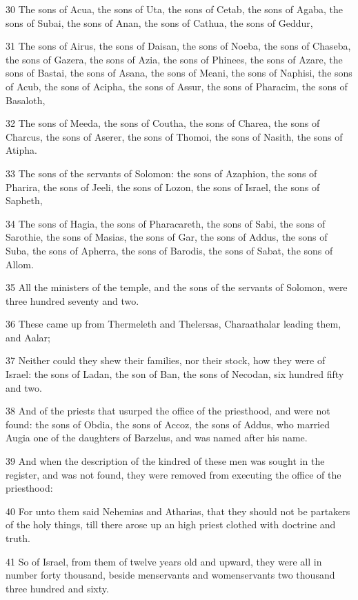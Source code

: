 \par 30 The sons of Acua, the sons of Uta, the sons of Cetab, the sons of Agaba, the sons of Subai, the sons of Anan, the sons of Cathua, the sons of Geddur,
\par 31 The sons of Airus, the sons of Daisan, the sons of Noeba, the sons of Chaseba, the sons of Gazera, the sons of Azia, the sons of Phinees, the sons of Azare, the sons of Bastai, the sons of Asana, the sons of Meani, the sons of Naphisi, the sons of Acub, the sons of Acipha, the sons of Assur, the sons of Pharacim, the sons of Basaloth,
\par 32 The sons of Meeda, the sons of Coutha, the sons of Charea, the sons of Charcus, the sons of Aserer, the sons of Thomoi, the sons of Nasith, the sons of Atipha.
\par 33 The sons of the servants of Solomon: the sons of Azaphion, the sons of Pharira, the sons of Jeeli, the sons of Lozon, the sons of Israel, the sons of Sapheth,
\par 34 The sons of Hagia, the sons of Pharacareth, the sons of Sabi, the sons of Sarothie, the sons of Masias, the sons of Gar, the sons of Addus, the sons of Suba, the sons of Apherra, the sons of Barodis, the sons of Sabat, the sons of Allom.
\par 35 All the ministers of the temple, and the sons of the servants of Solomon, were three hundred seventy and two.
\par 36 These came up from Thermeleth and Thelersas, Charaathalar leading them, and Aalar;
\par 37 Neither could they shew their families, nor their stock, how they were of Israel: the sons of Ladan, the son of Ban, the sons of Necodan, six hundred fifty and two.
\par 38 And of the priests that usurped the office of the priesthood, and were not found: the sons of Obdia, the sons of Accoz, the sons of Addus, who married Augia one of the daughters of Barzelus, and was named after his name.
\par 39 And when the description of the kindred of these men was sought in the register, and was not found, they were removed from executing the office of the priesthood:
\par 40 For unto them said Nehemias and Atharias, that they should not be partakers of the holy things, till there arose up an high priest clothed with doctrine and truth.
\par 41 So of Israel, from them of twelve years old and upward, they were all in number forty thousand, beside menservants and womenservants two thousand three hundred and sixty.
